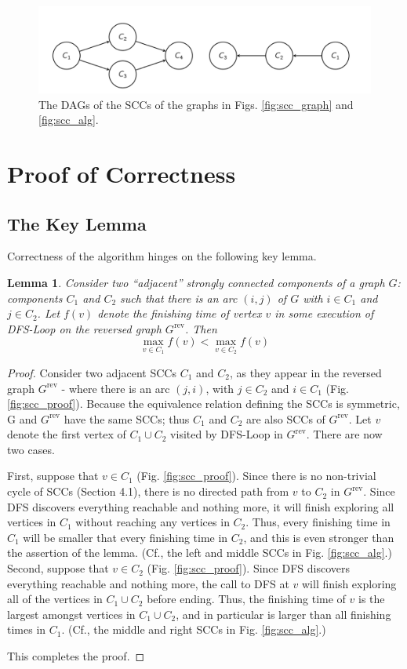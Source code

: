 \documentclass [12pt]{article}
\newtheorem{lemma}[theorem]{Lemma}
\theoremstyle{definition}
\begin{document}
\begin{figure}
\includegraphics[scale=0.8]{meta_graph_scc.png}
\caption{The DAGs of the SCCs of the graphs in Figs. \ref{fig:scc_graph} and \ref{fig:scc_alg}.}
\label{fig:meta_graph_scc}
\end{figure}

\section{Proof of Correctness}
\subsection{The Key Lemma}
Correctness of the algorithm hinges on the following key lemma.

\begin{lemma} 
Consider two ``adjacent'' strongly connected components of a graph $G$: components $C_1$ and $C_2$ such that there is an arc $(i, j)$ of $G$ with $i \in C_1$ and $j \in C_2$. Let $ f (v )$ denote the finishing time of vertex $v$ in some execution of DFS-Loop on the reversed graph $G^{\text{rev}}$. Then
$$
\max_{v\in C_1} f(v) < \max_{v\in C_2}f(v)
$$
\end{lemma}

\begin{proof} 
Consider two adjacent SCCs $C_1$ and $C_2$, as they appear in the reversed graph $G^{\text{rev}}$ - where there is an arc $(j, i)$, with $j \in C_2$ and $i \in C_1$ (Fig. \ref{fig:scc_proof}). Because the equivalence relation defining the SCCs is symmetric, G and $G^{\text{rev}}$ have the same SCCs; thus $C_1$ and $C_2$ are also SCCs of $G^{\text{rev}}$. Let $v$ denote the first vertex of $C_1 \cup C_2$ visited by DFS-Loop in $G^{\text{rev}}$. There are now two cases. 

First, suppose that $v \in C_1$ (Fig. \ref{fig:scc_proof}). Since there is no non-trivial cycle of SCCs (Section 4.1), there is no directed path from $v$ to $C_2$ in $G^{\text{rev}}$. Since DFS discovers everything reachable and nothing more, it will finish exploring all vertices in $C_1$ without reaching any vertices in $C_2.$ Thus, every finishing time in $C_1$ will be smaller that every finishing time in $C_2$, and this is even stronger than the assertion of the lemma. (Cf., the left and middle SCCs in Fig. \ref{fig:scc_alg}.) Second, suppose that $v \in C_2$ (Fig. \ref{fig:scc_proof}). Since DFS discovers everything reachable and nothing more, the call to DFS at $v$ will finish exploring all of the vertices in $C_1 \cup C_2$ before ending. Thus, the finishing time of $v$ is the largest amongst vertices in $C_1 \cup C_2$, and in particular is larger than all finishing times in $C_1$. (Cf., the middle and right SCCs in Fig. \ref{fig:scc_alg}.)

This completes the proof.
\end{proof}
\end{document}
